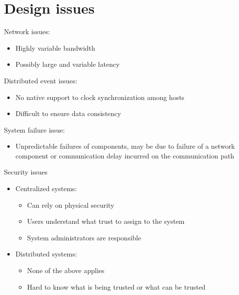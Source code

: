\documentclass{article}[18pt]
\begin{document}
\section{Design issues}
Network issues:
\begin{itemize}
	\item Highly variable bandwidth
	\item Possibly large and variable latency
\end{itemize}
Distributed event issues:
\begin{itemize}
	\item No native support to clock synchronization among hosts
	\item Difficult to ensure data consistency
\end{itemize}
System failure issue:
\begin{itemize}
	\item Unpredictable failures of components, may be due to failure of a network component or communication delay incurred on the communication path
\end{itemize}
Security issues
\begin{itemize}
	\item Centralized systems:
	\begin{itemize}
		\item Can rely on physical security
		\item Users understand what trust to assign to the system
		\item System administrators are responsible
	\end{itemize}
	\item Distributed systems:
	\begin{itemize}
		\item None of the above applies
		\item Hard to know what is being trusted or what can be trusted
	\end{itemize}
\end{itemize}
\end{document}
